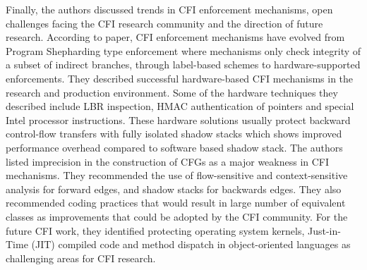 \documentclass[dvips,12pt]{article}
\begin{document}
\newline
\newline
Finally, the authors discussed trends in CFI enforcement mechanisms, open challenges facing the CFI research community and the direction of future research. According to paper, CFI enforcement mechanisms have evolved from Program Shepharding type enforcement where mechanisms only check integrity of a subset of indirect branches, through label-based schemes to hardware-supported enforcements. They described successful hardware-based CFI mechanisms in the research and production environment. Some of the hardware techniques they described include LBR inspection, HMAC authentication of pointers and special Intel processor instructions. These hardware solutions usually protect backward control-flow transfers with fully isolated shadow stacks which shows improved performance overhead compared to software based shadow stack. The authors listed imprecision in the construction of CFGs as a major weakness in CFI mechanisms. They recommended the use of flow-sensitive and context-sensitive analysis for forward edges, and shadow stacks for backwards edges. They also recommended coding practices that would result in large number of equivalent classes as improvements that could be adopted by the CFI community. For the future CFI work, they identified protecting operating system kernels, Just-in-Time (JIT) compiled code and method dispatch in object-oriented languages as challenging areas for CFI research.










 





\end{document}
